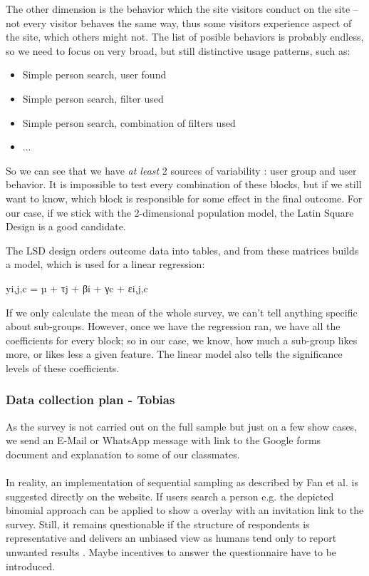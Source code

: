 \documentclass[12pt,a4paper,paper=a4,oneside,titlepage,pdftex]{scrartcl}
\begin{document}
The other dimension is the behavior which the site visitors conduct on the site -- not every visitor behaves the same way, thus some visitors experience aspect of the site, which others might not. The list of posible behaviors is probably endless, so we need to focus on very broad, but still distinctive usage patterns, such as:
\begin{itemize}
	\item Simple person search, user found
	\item Simple person search, filter used
	\item Simple person search, combination of filters used
	\item ...
\end{itemize}

So we can see that we have \textit{at least }2 sources of variability : user group and user behavior. It is impossible to test every combination of these blocks, but if we still want to know, which block is responsible for some effect in the final outcome. For our case, if we stick with the 2-dimensional population model, the Latin Square Design is a good candidate.

The LSD design orders outcome data into tables, and from these matrices builds a model, which is used for a linear regression:

yi,j,c = µ + τj + βi + γc + εi,j,c

If we only calculate the mean of the whole survey, we can't tell anything specific about sub-groups. However, once we have the regression ran, we have all the coefficients for every block; so in our case, we know, how much a sub-group likes more, or likes less a given feature. The linear model also tells the significance levels of these coefficients.


\subsubsection{Data collection plan - Tobias}
As the survey is not carried out on the full sample but just on a few show cases, we send an E-Mail or WhatsApp message with link to the Google forms document and explanation to some of our classmates.
\\ \\
In reality, an implementation of sequential sampling as described by Fan et al. \cite{fan1962development} is suggested directly on the website. If users search a person e.g. the depicted binomial approach can be applied to show a overlay with an invitation link to the survey. Still, it remains questionable if the structure of respondents is representative and delivers an unbiased view as humans tend only to report unwanted results \cite{bergstrand1983bias}. Maybe incentives to answer the questionnaire have to be introduced.
\end{document}

